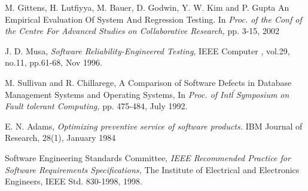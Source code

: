 \documentclass[conference]{IEEEtran}
\begin{document}
\begin{thebibliography}{1}
M. Gittens, H. Lutfiyya, M. Bauer, D. Godwin, Y. W. Kim and P. Gupta An Empirical Evaluation Of System And Regression Testing. In \emph{Proc. of the Conf of the Centre For Advanced Studies on Collaborative Research,} pp. 3-15, 2002

J. D. Musa, \emph{Software Reliability-Engineered Testing}, IEEE Computer , vol.29, no.11, pp.61-68, Nov 1996.

M. Sullivan and R. Chillarege, A Comparison of Software Defects in Database Management Systems and Operating Systems, In \emph{Proc. of Int\'l Symposium on Fault tolerant Computing,} pp. 475-484, July 1992.

E. N. Adams, \emph{Optimizing preventive service of software products.} IBM Journal of Research, 28(1), January 1984

Software Engineering Standards Committee, \emph{IEEE Recommended Practice for Software Requirements Specifications,} The Institute of Electrical and Electronics Engineers, IEEE Std. 830-1998, 1998.

\end{thebibliography}

\end{document}
